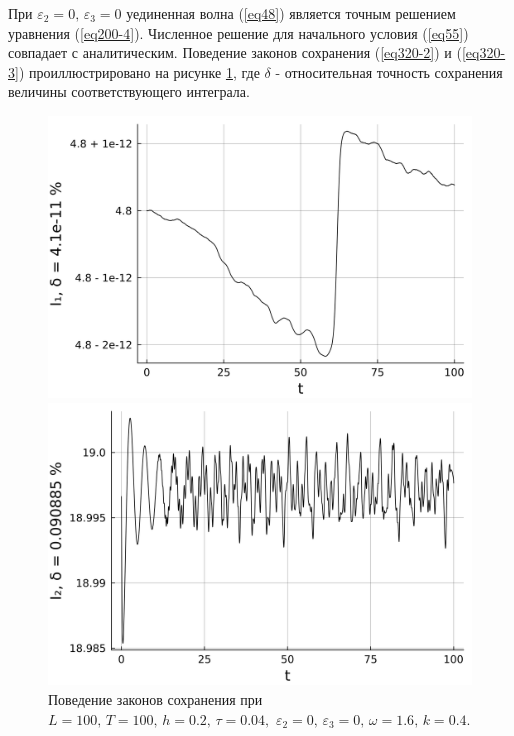 \documentclass[14pt,a4paper]{extreport}
\begin{document}
			При \(\varepsilon_{2}=0,\,\varepsilon_{3}=0\) уединенная волна (\ref{eq48}) является точным решением уравнения (\ref{eq200-4}). Численное решение для начального условия (\ref{eq55}) совпадает с аналитическим. Поведение законов сохранения (\ref{eq320-2}) и (\ref{eq320-3}) проиллюстрировано на рисунке \ref{fig340-1}, где \(\delta\) - относительная точность сохранения величины соответствующего интеграла.
			\begin{figure}[H] %
				\begin{center}
					\begin{minipage}[h]{0.48\linewidth}
						\includegraphics[width=1\linewidth]{fig61.png}
					\end{minipage}
					\hfill
					\begin{minipage}[h]{0.48\linewidth}
						\includegraphics[width=1\linewidth]{fig62.png}
					\end{minipage}
				\end{center}
				\caption{Поведение законов сохранения при
				\(L=100,\, T=100,\, h=0.2,\, \tau=0.04,\)
				\(\varepsilon_{2}=0,\,\varepsilon_{3}=0,\, \omega=1.6,\, k=0.4\).}
				\label{fig340-1}
			\end{figure}
\end{document}
